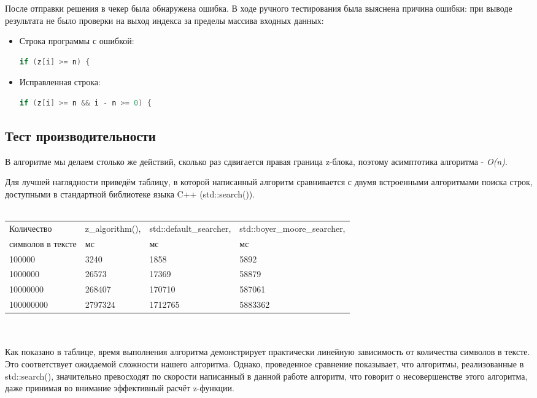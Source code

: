 \documentclass[12pt]{article}
\begin{document}
После отправки решения в чекер была обнаружена ошибка. В ходе ручного тестирования была выяснена причина ошибки: при выводе результата не было проверки на выход индекса за пределы массива входных данных:
\begin{itemize}
\item
    Строка программы с ошибкой:
    \begin{lstlisting}[language=C++]
            if (z[i] >= n) {
    \end{lstlisting}
\item
    Исправленная строка:
    \begin{lstlisting}[language=C++]
            if (z[i] >= n && i - n >= 0) {
    \end{lstlisting}
\end{itemize}

\subsection*{Тест производительности}
В алгоритме мы делаем столько же действий, сколько раз сдвигается правая граница z-блока, поэтому асимптотика алгоритма - \textit{O(n)}.

Для лучшей наглядности приведём таблицу, в которой написанный алгоритм сравнивается с двумя встроенными алгоритмами поиска строк, доступными в стандартной библиотеке языка C++ (std::search()).
\\
\\
\begin{tabularx}{\textwidth}{ |X|X|X|X| }
    \hline
    Количество & z\_algorithm(), & std::default\_searcher, & std::boyer\_moore\_searcher, \\
    символов в тексте  & мс & мс & мс \\
    \hline
    100000 & 3240 & 1858 & 5892 \\
    1000000 & 26573 & 17369 & 58879 \\
    10000000 & 268407 & 170710 & 587061 \\
    100000000 & 2797324 & 1712765 & 5883362 \\
    \hline
\end{tabularx}
\\
\\
Как показано в таблице, время выполнения алгоритма демонстрирует практически линейную зависимость от количества символов в тексте. Это соответствует ожидаемой сложности нашего алгоритма. Однако, проведенное сравнение показывает, что алгоритмы, реализованные в std::search(), значительно превосходят по скорости написанный в данной работе алгоритм, что говорит о несовершенстве этого алгоритма, даже принимая во внимание эффективный расчёт z-функции.
\end{document}
